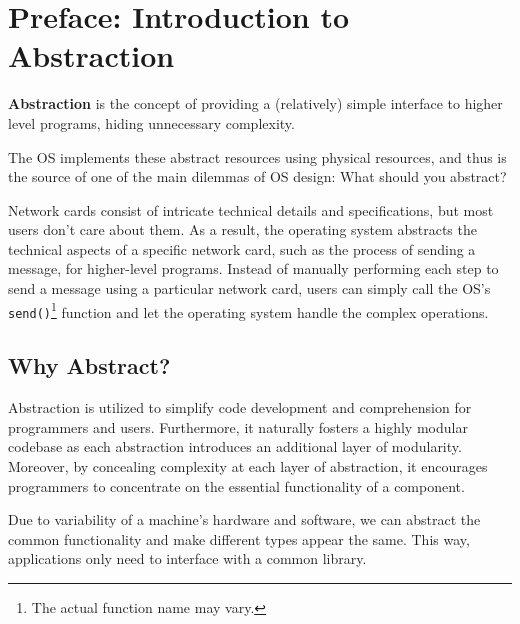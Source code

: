 \documentclass{report}
\begin{document}
\chapter*{Preface: Introduction to Abstraction}
\begin{tcolorbox}[title=Definition: Abstraction]
  \textbf{Abstraction} is the concept of providing a (relatively) simple interface to higher level
  programs, hiding unnecessary complexity.
\end{tcolorbox}

The OS implements these abstract resources using physical resources, and thus is the source of one
of the main dilemmas of OS design: What should you abstract?

\begin{tcolorbox}[colback=blue!5!white,colframe=black!75!blue,title=Example: Network Neverland]
  Network cards consist of intricate technical details and specifications, but most users don't care
  about them. As a result, the operating system abstracts the technical aspects of a
  specific network card, such as the process of sending a message, for higher-level programs. Instead
  of manually performing each step to send a message using a particular network card, users can simply
  call the OS's \texttt{send()}\footnote{The actual function name may vary.} function and let the
  operating system handle the complex operations. 
\end{tcolorbox}





\section*{Why Abstract?}
Abstraction is utilized to simplify code development and comprehension for programmers and
users. Furthermore, it naturally fosters a highly modular codebase as each abstraction introduces an
additional layer of modularity. Moreover, by concealing complexity at each layer of abstraction, it
encourages programmers to concentrate on the essential functionality of a component. 

Due to variability of a machine's hardware and software, we can abstract the common
functionality and make different types appear the same. This way, applications only need to
interface with a common library. 
\end{document}
